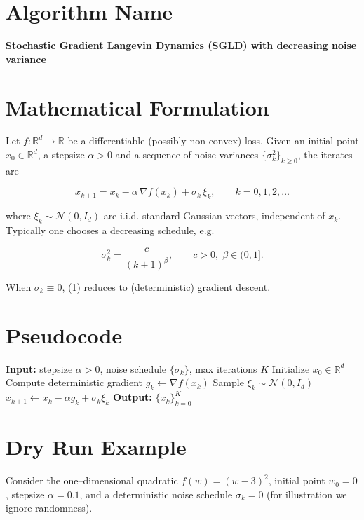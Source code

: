 \documentclass{article}
\newcommand{\R}{\mathbb{R}}
\begin{document}
\section*{Algorithm Name}
\textbf{Stochastic Gradient Langevin Dynamics (SGLD) with decreasing noise variance}

\section*{Mathematical Formulation}
Let $f:\R^{d}\rightarrow\R$ be a differentiable (possibly non‑convex) loss.  
Given an initial point $x_{0}\in\R^{d}$, a stepsize $\alpha>0$ and a sequence of noise variances $\{\sigma_{k}^{2}\}_{k\ge 0}$, the iterates are

\[
\boxed{
x_{k+1}=x_{k}-\alpha \,\nabla f(x_{k})+\sigma_{k}\,\xi_{k}},\qquad k=0,1,2,\dots
\tag{1}
\]

where $\xi_{k}\sim\mathcal N(0,I_{d})$ are i.i.d. standard Gaussian vectors, independent of $x_{k}$.  
Typically one chooses a decreasing schedule, e.g.

\[
\sigma_{k}^{2}= \frac{c}{(k+1)^{\beta}},\qquad c>0,\;\beta\in(0,1].
\tag{2}
\]

When $\sigma_{k}\equiv0$, (1) reduces to (deterministic) gradient descent.

\section*{Pseudocode}
\begin{algorithm}[H]
\caption{SGLD with decreasing noise}
\begin{algorithmic}[1]
\State \textbf{Input:} stepsize $\alpha>0$, noise schedule $\{\sigma_{k}\}$, max iterations $K$
\State Initialize $x_{0}\in\R^{d}$
    \State Compute deterministic gradient $g_{k}\gets \nabla f(x_{k})$
    \State Sample $\xi_{k}\sim\mathcal N(0,I_{d})$
    \State $x_{k+1}\gets x_{k}-\alpha g_{k}+ \sigma_{k}\xi_{k}$
\EndFor
\State \textbf{Output:} $\{x_{k}\}_{k=0}^{K}$
\end{algorithmic}
\end{algorithm}

\section*{Dry Run Example}
Consider the one–dimensional quadratic $f(w)=(w-3)^{2}$, initial point $w_{0}=0$, stepsize $\alpha=0.1$, and a deterministic noise schedule $\sigma_{k}=0$ (for illustration we ignore randomness).  
\end{document}
